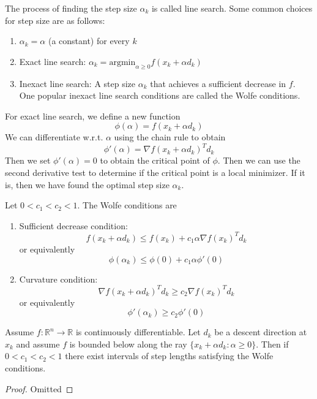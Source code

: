 The process of finding the step size $\alpha_k$ is called line search. Some common choices for step size are as follows:
\begin{enumerate}
  \item $\alpha_k = \alpha$ (a constant) for every $k$
  \item Exact line search: $\alpha_k = \text{argmin}_{\alpha \geq 0} f(x_k + \alpha d_k)$
  \item Inexact line search: A step size $\alpha_k$ that achieves a sufficient decrease in $f$. One popular inexact line search conditions are called the Wolfe conditions.
\end{enumerate}
\begin{problem}
  For exact line search, we define a new function
  $$\phi(\alpha) = f(x_k + \alpha d_k)$$
  We can differentiate w.r.t. $\alpha$ using the chain rule to obtain
  $$\phi' (\alpha) = \nabla f(x_k + \alpha d_k)^T d_k$$
  Then we set $\phi'(\alpha) = 0$ to obtain the critical point of $\phi$. Then we can use the second derivative test to determine if the critical point is a local minimizer. If it is, then we have found the optimal step size $\alpha_k$.
\end{problem}
\begin{definition}
  Let $0 < c_1 < c_2 < 1$. The Wolfe conditions are
  \begin{enumerate}
    \item Sufficient decrease condition: $$f(x_k + \alpha d_k) \leq f(x_k) + c_1 \alpha \nabla f(x_k)^T d_k$$ or equivalently
    $$\phi(\alpha_k) \leq \phi(0) + c_1 \alpha \phi'(0)$$
    \item Curvature condition: $$\nabla f(x_k + \alpha d_k)^T d_k \geq c_2 \nabla f(x_k)^T d_k$$ or equivalently
    $$\phi'(\alpha_k) \geq c_2 \phi'(0)$$
  \end{enumerate}
\end{definition}
\begin{theorem}
  Assume $f: \mathbb R^n \to \mathbb R$ is continuously differentiable. Let $d_k$ be a descent direction at $x_k$ and assume $f$ is bounded below along the ray $\{x_k + \alpha d_k: \alpha \geq 0\}$. Then if $0 < c_1 < c_2 < 1$ there exist intervals of step lengths satisfying the Wolfe conditions.
\end{theorem}
\begin{proof}[Proof]
  Omitted
\end{proof}
